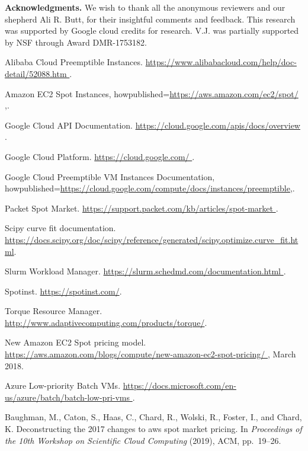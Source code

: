 \documentclass[sigconf]{acmart} %
\begin{document}
\noindent \textbf{Acknowledgments.} We wish to thank all the anonymous reviewers and our shepherd Ali R. Butt, for  their insightful comments and feedback.
This research was supported by Google cloud credits for research. 
V.J. was partially supported by NSF through Award DMR-1753182.

\begin{thebibliography}{10}

{Alibaba Cloud Preemptible Instances}.
\newblock \url{https://www.alibabacloud.com/help/doc-detail/52088.htm }.

{Amazon EC2 Spot Instances},
  howpublished={\url{https://aws.amazon.com/ec2/spot/ }},.

{Google Cloud API Documentation}.
\newblock \url{https://cloud.google.com/apis/docs/overview }.

{Google Cloud Platform}.
\newblock \url{https://cloud.google.com/ }.

{Google Cloud Preemptible VM Instances Documentation},
  howpublished={\url{https://cloud.google.com/compute/docs/instances/preemptible}},.

{Packet Spot Market}.
\newblock \url{https://support.packet.com/kb/articles/spot-market }.

Scipy curve fit documentation.
\newblock
  \url{https://docs.scipy.org/doc/scipy/reference/generated/scipy.optimize.curve_fit.html}.

{Slurm Workload Manager}.
\newblock \url{https://slurm.schedmd.com/documentation.html }.

{Spotinst}.
\newblock \url{https://spotinst.com/}.

{Torque Resource Manager}.
\newblock \url{http://www.adaptivecomputing.com/products/torque/}.

{New Amazon EC2 Spot pricing model}.
\newblock
  \url{https://aws.amazon.com/blogs/compute/new-amazon-ec2-spot-pricing/ },
  March 2018.

{Azure Low-priority Batch VMs}.
\newblock \url{https://docs.microsoft.com/en-us/azure/batch/batch-low-pri-vms
  }.

{\sc Baughman, M., Caton, S., Haas, C., Chard, R., Wolski, R., Foster, I., and
  Chard, K.}
\newblock Deconstructing the 2017 changes to aws spot market pricing.
\newblock In {\em Proceedings of the 10th Workshop on Scientific Cloud
  Computing\/} (2019), ACM, pp.~19--26.


\end{thebibliography}
\end{document}
